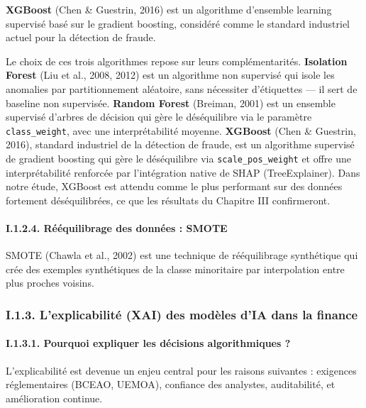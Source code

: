 \documentclass[
  12pt,
]{article}
\begin{document}
\textbf{XGBoost} (Chen \& Guestrin, 2016) est un algorithme d’ensemble
learning supervisé basé sur le gradient boosting, considéré comme le
standard industriel actuel pour la détection de fraude.

Le choix de ces trois algorithmes repose sur leurs complémentarités.
\textbf{Isolation Forest} (Liu et al., 2008, 2012) est un algorithme non
supervisé qui isole les anomalies par partitionnement aléatoire, sans
nécessiter d’étiquettes — il sert de baseline non supervisée.
\textbf{Random Forest} (Breiman, 2001) est un ensemble supervisé
d’arbres de décision qui gère le déséquilibre via le paramètre
\texttt{class\_weight}, avec une interprétabilité moyenne.
\textbf{XGBoost} (Chen \& Guestrin, 2016), standard industriel de la
détection de fraude, est un algorithme supervisé de gradient boosting
qui gère le déséquilibre via \texttt{scale\_pos\_weight} et offre une
interprétabilité renforcée par l’intégration native de SHAP
(TreeExplainer). Dans notre étude, XGBoost est attendu comme le plus
performant sur des données fortement déséquilibrées, ce que les
résultats du Chapitre III confirmeront.

\paragraph{I.1.2.4. Rééquilibrage des données :
SMOTE}\label{i.1.2.4.-ruxe9uxe9quilibrage-des-donnuxe9es-smote}

SMOTE (Chawla et al., 2002) est une technique de rééquilibrage
synthétique qui crée des exemples synthétiques de la classe minoritaire
par interpolation entre plus proches voisins.

\subsubsection{I.1.3. L’explicabilité (XAI) des modèles d’IA dans la
finance}\label{i.1.3.-lexplicabilituxe9-xai-des-moduxe8les-dia-dans-la-finance}

\paragraph{I.1.3.1. Pourquoi expliquer les décisions algorithmiques
?}\label{i.1.3.1.-pourquoi-expliquer-les-duxe9cisions-algorithmiques}

L’explicabilité est devenue un enjeu central pour les raisons suivantes
: exigences réglementaires (BCEAO, UEMOA), confiance des analystes,
auditabilité, et amélioration continue.
\end{document}
